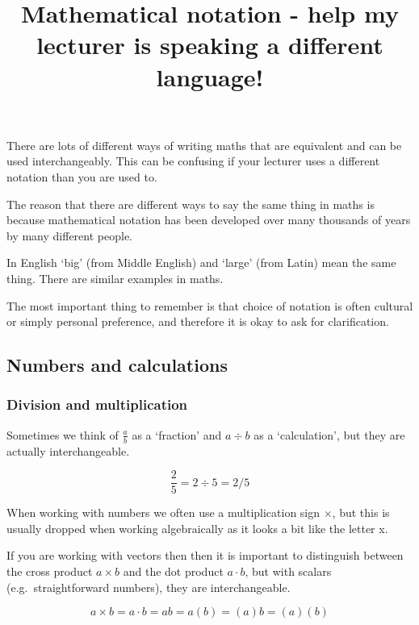 \documentclass[
]{article}
\title{Mathematical notation - help my lecturer is speaking a different
language!}
\author{}
\date{\vspace{-2.5em}}
\begin{document}
\maketitle

There are lots of different ways of writing maths that are equivalent
and can be used interchangeably. This can be confusing if your lecturer
uses a different notation than you are used to.

The reason that there are different ways to say the same thing in maths
is because mathematical notation has been developed over many thousands
of years by many different people.

In English `big' (from Middle English) and `large' (from Latin) mean the
same thing. There are similar examples in maths.

The most important thing to remember is that choice of notation is often
cultural or simply personal preference, and therefore it is okay to ask
for clarification.

\hypertarget{numbers-and-calculations}{%
\subsection{Numbers and calculations}\label{numbers-and-calculations}}

\hypertarget{division-and-multiplication}{%
\subsubsection{Division and
multiplication}\label{division-and-multiplication}}

Sometimes we think of \(\frac{a}{b}\) as a `fraction' and \(a\div b\) as
a `calculation', but they are actually interchangeable.

\begin{equation}

\frac{2}{5} = 2\div 5 = 2/5  

\end{equation}

When working with numbers we often use a multiplication sign \(\times\),
but this is usually dropped when working algebraically as it looks a bit
like the letter x.

If you are working with vectors then then it is important to distinguish
between the cross product \(a \times b\) and the dot product
\(a \cdot b\), but with scalars (e.g.~straightforward numbers), they are
interchangeable.

\begin{equation}
a \times b = a \cdot b = ab = a(b) = (a)b = (a)(b) 

\end{equation}
\end{document}
